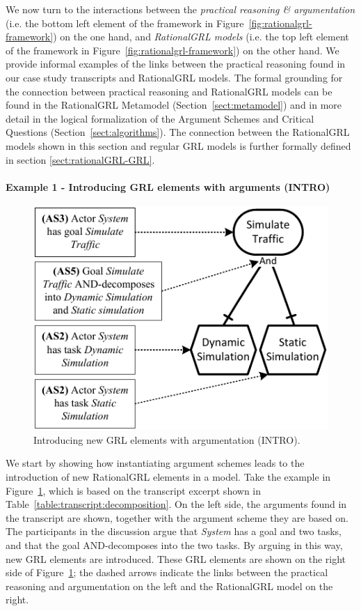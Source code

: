 We now turn to the interactions between the \emph{practical reasoning \& argumentation} (i.e. the bottom left element of the framework in Figure~\ref{fig:rationalgrl-framework}) on the one hand, and \emph{RationalGRL models} (i.e. the top left element of the framework in Figure~\ref{fig:rationalgrl-framework}) on the other hand. We provide informal examples of the links between the practical reasoning found in our case study transcripts and RationalGRL models. The formal grounding for the connection between practical reasoning and RationalGRL models can be found in the RationalGRL Metamodel (Section~\ref{sect:metamodel}) and in more detail in the logical formalization of the Argument Schemes and Critical Questions (Section~\ref{sect:algorithms}). The connection between the RationalGRL models shown in this section and regular GRL models is further formally defined in section \ref{sect:rationalGRL-GRL}. 

\paragraph{Example 1 - Introducing GRL elements with arguments (\textsf{INTRO)}}

\begin{figure}[t]
\centering
\includegraphics[width=\columnwidth]{img/fig_example_AS.pdf}
\caption{Introducing new GRL elements with argumentation (\textsf{INTRO)}.}
\label{fig:example_AS}
\end{figure}

We start by showing how instantiating argument schemes leads to the introduction of new RationalGRL elements in a model. Take the example in Figure~\ref{fig:example_AS}, which is based on the transcript excerpt shown in Table~\ref{table:transcript:decomposition}. On the left side, the arguments found in the transcript are shown, together with the argument scheme they are based on. The participants in the discussion argue that \emph{System} has a goal and two tasks, and that the goal AND-decomposes into the two tasks. By arguing in this way, new GRL elements are introduced. These GRL elements are shown on the right side of Figure~\ref{fig:example_AS}; the dashed arrows indicate the links between the practical reasoning and argumentation on the left and the RationalGRL model on the right. 


